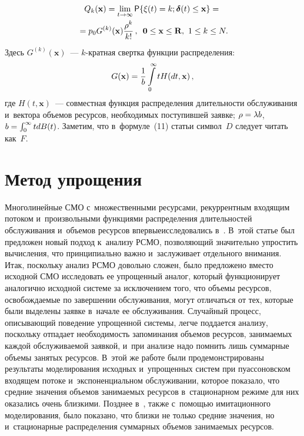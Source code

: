 \begin{multicols}{2}
\noindent
\begin{multline*}
Q_k(\mathbf{x})=\lim\limits_{t\rightarrow \infty}{\sf P}\{ \xi(t)=k; 
\boldsymbol{\delta}(t)\leq \mathbf{x}\}={}\\
{}= p_0G^{(k)}(\mathbf{x}) 
\displaystyle\frac{\displaystyle \rho^{k}\mathstrut}{\displaystyle k!\mathstrut}\,,\enskip \mathbf{0}\leq \mathbf{x} \leq \mathbf{R},\
1\leq k \leq N.
\end{multline*}
Здесь $G^{(k)}(\mathbf{x})$~--- $k$-крат\-ная свертка функции распределения:
\begin{equation*}
G(\mathbf{x})=\displaystyle\frac{\displaystyle 1\mathstrut}{\displaystyle b\mathstrut}\int\limits_{0}^{\infty}tH(dt,\mathbf{x})\,,
\end{equation*}
где $H(t,\mathbf{x})$~--- совместная функция распределения длительности 
обслуживания и~вектора объемов ресурсов, необходимых поступившей заявке; 
$\rho\hm=\lambda b$, $b\hm=\int\nolimits_{0}^{\infty}tdB(t)$.
Заметим, что в~формуле~(11) \mbox{статьи} \cite{Naumov_18_2016} символ~$D$ следует 
читать как~$F$.

\section{Метод упрощения}

Многолинейные СМО с~множественными ресурсами, рекуррентным входящим потоком 
и~произвольными функциями распределения длительностей обслуживания и~объемов 
ресурсов впервые\linebreak исследовались в~\cite{Naumov_1_2014}. В~этой статье был 
предложен новый подход к~анализу РСМО,
поз\-во\-ля\-ющий значительно упростить вычисления, что принципиально важно 
и~заслуживает отдельного внимания. Итак, поскольку анализ РСМО довольно сложен,
было предложено вместо исходной СМО исследовать ее упрощенный аналог, который 
функционирует аналогично исходной сис\-те\-ме за исключением того,  что объемы 
ресурсов, освобождаемые по за\-вер\-шении обслуживания, могут отличаться от тех, %
которые были выделены заявке в~начале ее обслуживания.
Случайный процесс, опи\-сы\-ва\-ющий поведение упрощенной сис\-те\-мы, легче поддается 
анализу, поскольку отпадает необходимость запоминания объемов ресурсов, 
занимаемых каж\-дой обслуживаемой заявкой, и~при анализе надо пом\-нить лишь 
суммарные объемы занятых ресурсов.
В~этой же работе были продемонстрированы результаты моделирования исходных 
и~упрощенных сис\-тем при пуассоновском входящем потоке и~экспоненциальном 
обслуживании, которое показало,  что средние значения объемов занимаемых 
ресурсов в~стационарном режиме для них оказались очень близкими. Позднее 
в~\cite{Naumov_2_2014}, также с~помощью имитационного моделирования, было 
показано, что близ\-ки не только средние значения, но и~стационарные распределения 
суммарных объемов занимаемых ресурсов.


\end{multicols}
